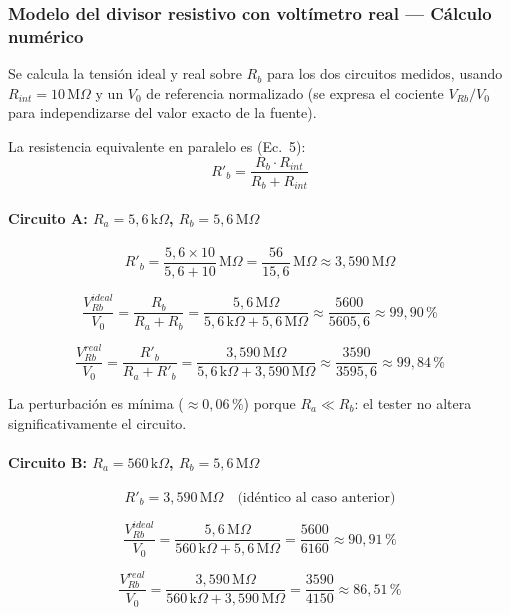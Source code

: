 \clearpage
\subsubsection{Modelo del divisor resistivo con voltímetro real --- Cálculo numérico}
\label{subsubsec:divisor-resistivo-voltimetro-real}
 
Se calcula la tensión ideal y real sobre $R_b$ para los dos circuitos medidos,
usando $R_{int} = 10\,\text{M}\Omega$ y un $V_0$ de referencia normalizado
(se expresa el cociente $V_{Rb}/V_0$ para independizarse del valor exacto de la fuente).
 
La resistencia equivalente en paralelo es (Ec.~5):
\[
    R'_b = \frac{R_b \cdot R_{int}}{R_b + R_{int}}
\]
 
\paragraph{Circuito A: $R_a = 5{,}6\,\text{k}\Omega$, $R_b = 5{,}6\,\text{M}\Omega$}
 
\[
    R'_b = \frac{5{,}6 \times 10}{5{,}6 + 10}\,\text{M}\Omega
         = \frac{56}{15{,}6}\,\text{M}\Omega \approx 3{,}590\,\text{M}\Omega
\]
 
\[
    \frac{V_{Rb}^{ideal}}{V_0} = \frac{R_b}{R_a + R_b}
    = \frac{5{,}6\,\text{M}\Omega}{5{,}6\,\text{k}\Omega + 5{,}6\,\text{M}\Omega}
    \approx \frac{5600}{5605{,}6} \approx 99{,}90\,\%
\]
 
\[
    \frac{V_{Rb}^{real}}{V_0} = \frac{R'_b}{R_a + R'_b}
    = \frac{3{,}590\,\text{M}\Omega}{5{,}6\,\text{k}\Omega + 3{,}590\,\text{M}\Omega}
    \approx \frac{3590}{3595{,}6} \approx 99{,}84\,\%
\]
 
La perturbación es mínima (${\approx}0{,}06\,\%$) porque $R_a \ll R_b$:
el tester no altera significativamente el circuito.
 
\paragraph{Circuito B: $R_a = 560\,\text{k}\Omega$, $R_b = 5{,}6\,\text{M}\Omega$}
 
\[
    R'_b = 3{,}590\,\text{M}\Omega \quad \text{(idéntico al caso anterior)}
\]
 
\[
    \frac{V_{Rb}^{ideal}}{V_0} = \frac{5{,}6\,\text{M}\Omega}{560\,\text{k}\Omega + 5{,}6\,\text{M}\Omega}
    = \frac{5600}{6160} \approx 90{,}91\,\%
\]
 
\[
    \frac{V_{Rb}^{real}}{V_0} = \frac{3{,}590\,\text{M}\Omega}{560\,\text{k}\Omega + 3{,}590\,\text{M}\Omega}
    = \frac{3590}{4150} \approx 86{,}51\,\%
\]
 
